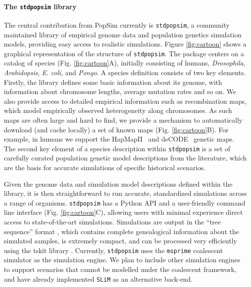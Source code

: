 \documentclass[12pt,halfline,a4paper]{ouparticle}
\newcommand{\stdpopsim}{\texttt{stdpopsim}\xspace}
\begin{document}
\paragraph{The \stdpopsim library}
The central contribution from PopSim currently is \stdpopsim, a community
maintained library of empirical genome data and population genetics simulation
models, providing easy access to realistic simulations. Figure \ref{fig:cartoon} shows a graphical
representation of the structure of \stdpopsim. The package centers
on a catalog of species (Fig. \ref{fig:cartoon}A), initially consisting of humans, \emph{Drosophila},
\emph{Arabidopsis}, \emph{E. coli}, and \emph{Pongo}. A species definition consists
of two key elements.  Firstly, the library defines
some basic information about its genome, with information about chromosome
lengths, average mutation rates and so on. We also provide access to detailed
empirical information such as recombination maps, which model empirically
observed heterogeneity along chromosomes. As such maps are often large and hard
to find, we provide a mechanism to automatically download (and cache locally) a
set of known maps (Fig. \ref{fig:cartoon}B). For example, in humans we support the
HapMapII~\citep{international2007second} and
deCODE~\citep{kong2010fine} genetic maps. The second key element of a species description
within \stdpopsim is a set of carefully curated population genetic model
descriptions from the literature, which are the basis for accurate simulations
of specific historical scenarios.

Given the genome data and simulation model descriptions defined within the
library, it is then straightforward to run accurate, standardized simulations
across a range of organisms. \stdpopsim has a Python API and a user-friendly
command line interface (Fig. \ref{fig:cartoon}C), allowing users with minimal experience direct access to
state-of-the-art simulations. Simulations are output in the “tree sequence”
format \citep{kelleher2016efficient,kelleher2018efficient,kelleher2019inferring}, which
contains complete genealogical information about the simulated samples, is
extremely compact, and can be processed very efficiently using the tskit library
\citep{kelleher2016efficient,kelleher2018efficient}. Currently,
\stdpopsim uses the  \texttt{msprime} coalescent simulator \citep{kelleher2016efficient}
as the simulation engine. We plan to include other simulation
engines to support scenarios that cannot be modelled under the coalescent framework,
and have already implemented \texttt{SLiM} \citep{haller2019slim} as
an alternative back-end.
\end{document}
